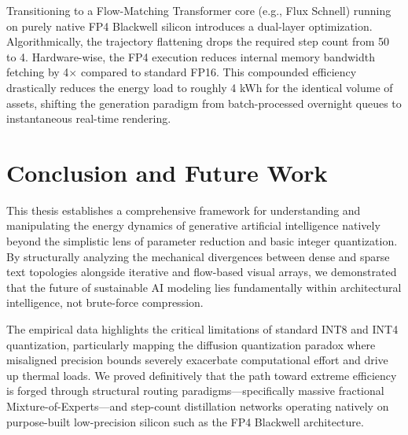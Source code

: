 \documentclass[12pt, a4paper]{report}
\begin{document}
Transitioning to a Flow-Matching Transformer core (e.g., Flux Schnell) running on purely native FP4 Blackwell silicon introduces a dual-layer optimization. Algorithmically, the trajectory flattening drops the required step count from 50 to 4. Hardware-wise, the FP4 execution reduces internal memory bandwidth fetching by 4$\times$ compared to standard FP16. This compounded efficiency drastically reduces the energy load to roughly 4 kWh for the identical volume of assets, shifting the generation paradigm from batch-processed overnight queues to instantaneous real-time rendering.


\chapter{Conclusion and Future Work}
\label{ch:conclusion}

This thesis establishes a comprehensive framework for understanding and manipulating the energy dynamics of generative artificial intelligence natively beyond the simplistic lens of parameter reduction and basic integer quantization. By structurally analyzing the mechanical divergences between dense and sparse text topologies alongside iterative and flow-based visual arrays, we demonstrated that the future of sustainable AI modeling lies fundamentally within architectural intelligence, not brute-force compression.

The empirical data highlights the critical limitations of standard INT8 and INT4 quantization, particularly mapping the diffusion quantization paradox where misaligned precision bounds severely exacerbate computational effort and drive up thermal loads. We proved definitively that the path toward extreme efficiency is forged through structural routing paradigms—specifically massive fractional Mixture-of-Experts—and step-count distillation networks operating natively on purpose-built low-precision silicon such as the FP4 Blackwell architecture.
\end{document}
